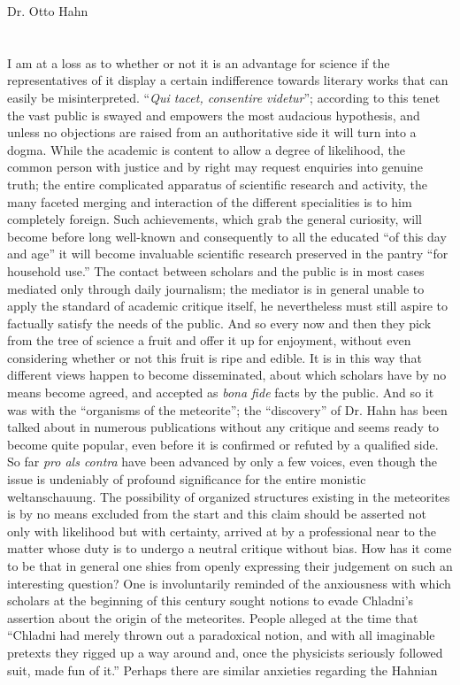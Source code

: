 \documentclass[a4paper, 12pt, oneside]{article}
\begin{document}
Dr. Otto Hahn
\clearpage
\section{}
\paragraph*{}
I am at a loss as to whether or not it is an advantage for science if the representatives of it display a certain indifference towards literary works that can easily be misinterpreted. ``\emph{Qui tacet, consentire videtur}''; according to this tenet the vast public is swayed and empowers the most audacious hypothesis, and unless no objections are raised from an authoritative side it will turn into a dogma. While the academic is content to allow a degree of likelihood, the common person with justice and by right may request enquiries into genuine truth; the entire complicated apparatus of scientific research and activity, the many faceted merging and interaction of the different specialities is to him completely foreign. Such achievements, which grab the general curiosity, will become before long well-known and consequently to all the educated ``of this day and age'' it will become invaluable scientific research preserved in the pantry ``for household use.'' The contact between scholars and the public is in most cases mediated only through daily journalism; the mediator is in general unable to apply the standard of academic critique itself, he nevertheless must still aspire to factually satisfy the needs of the public. And so every now and then they pick from the tree of science a fruit and offer it up for enjoyment, without even considering whether or not this fruit is ripe and edible. It is in this way that different views happen to become disseminated, about which scholars have by no means become agreed, and accepted as \emph{bona fide} facts by the public. And so it was with the ``organisms of the meteorite''; the ``discovery'' of Dr. Hahn has been talked about in numerous publications without any critique and seems ready to become quite popular, even before it is confirmed or refuted by a qualified side. So far \emph{pro als contra} have been advanced by only a few voices, even though the issue is undeniably of profound significance for the entire monistic weltanschauung. The possibility of organized structures existing in the meteorites is by no means excluded from the start and this claim should be asserted not only with likelihood but with certainty, arrived at by a professional near to the matter whose duty is to undergo a neutral critique without bias. How has it come to be that in general one shies from openly expressing their judgement on such an interesting question? One is involuntarily reminded of the anxiousness with which scholars at the beginning of this century sought notions to evade Chladni's assertion about the origin of the meteorites. People alleged at the time that ``Chladni had merely thrown out a paradoxical notion, and with all imaginable pretexts they rigged up a way around and, once the physicists seriously followed suit, made fun of it.'' Perhaps there are similar anxieties regarding the Hahnian 
\end{document}
